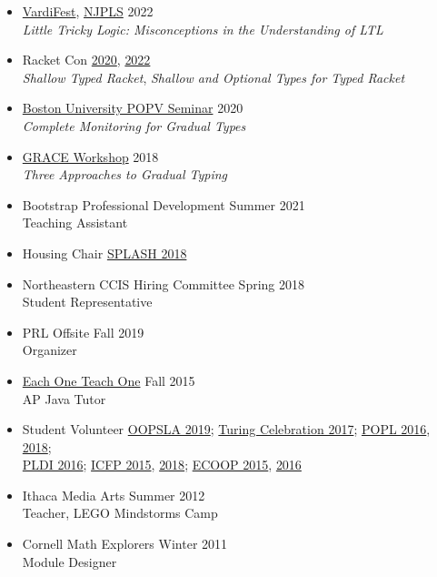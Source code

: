 \documentclass[11pt]{article}
\begin{document}
\begin{itemize}
  \item
    \href{https://vardifest.github.io}{VardiFest}, \href{http://njpls.org/oct22.html}{NJPLS} \hfill 2022\\
    \emph{Little Tricky Logic: Misconceptions in the Understanding of LTL}
  \item
    Racket Con \hfill \href{https://con.racket-lang.org/2020}{2020}, \href{https://con.racket-lang.org/2022}{2022}\\
    \emph{Shallow Typed Racket}, \emph{Shallow and Optional Types for Typed Racket}
  \item
    \href{https://www.bu.edu/cs/research/popv/seminar/}{Boston University POPV Seminar} \hfill {2020}\\
    \emph{Complete Monitoring for Gradual Types}
  \item
    \href{https://2018.splashcon.org/track/grace-2018-papers}{GRACE Workshop} \hfill 2018\\
    \emph{Three Approaches to Gradual Typing}
\end{itemize}


\begin{itemize}
  \item {Bootstrap Professional Development} \hfill {Summer 2021}\\
        Teaching Assistant
  \item {Housing Chair} \hfill \href{https://2018.splashcon.org/committee/splash-2018-organizing-committee}{SPLASH 2018}
  \item {Northeastern CCIS Hiring Committee} \hfill {Spring 2018}\\
    Student Representative
  \item {PRL Offsite} \hfill {Fall 2019}\\
    Organizer
  \item \href{https://www.eachoneteachone.is}{Each One Teach One} \hfill {Fall 2015}\\
    AP Java Tutor
  \item {Student Volunteer} \hfill \href{https://2019.splashcon.org/}{OOPSLA 2019}; \href{https://www.acm.org/turing-award-50/conference}{Turing Celebration 2017}; \href{http://conf.researchr.org/home/POPL-2016}{POPL 2016}, \href{http://conf.researchr.org/home/POPL-2018}{2018};\\
    {\hbox{}\hfill{} \href{http://conf.researchr.org/home/PLDI-2016}{PLDI 2016}; \href{http://icfpconference.org/icfp2015/}{ICFP 2015}, \href{https://icfp18.sigplan.org/committee/icfp-2018-organizing-committee}{2018}; \href{http://2015.ecoop.org/}{ECOOP 2015}, \href{http://2016.ecoop.org/}{2016}}
  \item {Ithaca Media Arts} \hfill {Summer 2012}\\
    Teacher, LEGO Mindstorms Camp
  \item {Cornell Math Explorers} \hfill {Winter 2011}\\
    Module Designer

\end{itemize}
\end{document}

